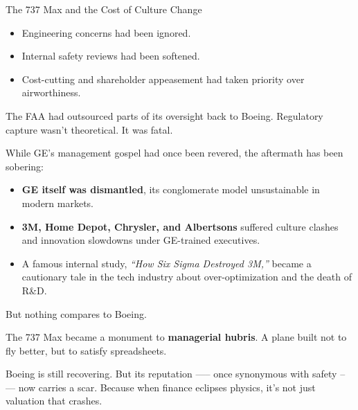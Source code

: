 \begin{HistoricalSidebar}{The 737 Max and the Cost of Culture Change}
  \medskip

  \begin{itemize}
    \item Engineering concerns had been ignored.
    \item Internal safety reviews had been softened.
    \item Cost-cutting and shareholder appeasement had taken priority over airworthiness.
  \end{itemize}

  \medskip
  
  The FAA had outsourced parts of its oversight back to Boeing.  
  Regulatory capture wasn’t theoretical. It was fatal.
  
  \medskip
  
  While GE’s management gospel had once been revered, the aftermath has been sobering:
  
  \medskip

  \begin{itemize}
    \item \textbf{GE itself was dismantled}, its conglomerate model unsustainable in modern markets.
    \item \textbf{3M, Home Depot, Chrysler, and Albertsons} suffered culture clashes and innovation slowdowns under 
    GE-trained executives.
    \item A famous internal study, \textit{“How Six Sigma Destroyed 3M,”} became a cautionary tale in the tech 
    industry about over-optimization and the death of R\&D.
  \end{itemize}

  \medskip
  
  But nothing compares to Boeing.
  
  \medskip
  
  The 737 Max became a monument to \textbf{managerial hubris}.  
  A plane built not to fly better, but to satisfy spreadsheets.
  
  \medskip
  
  Boeing is still recovering. But its reputation —-- once synonymous with safety --— now carries a scar.  
  Because when finance eclipses physics, it’s not just valuation that crashes.
  
\end{HistoricalSidebar}








